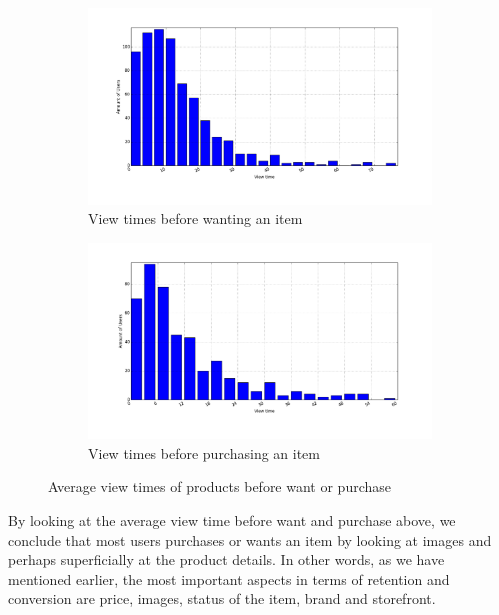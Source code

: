 \begin{figure}[H]
  \centering
  \begin{subfigure}{.5\textwidth}
      \centering
      \includegraphics[width=\dualGraphWidth]{image/product_wanteddistribution.png}
      \caption{View times before wanting an item}
      \label{figure:viewWant}
  \end{subfigure}%
  \begin{subfigure}{.5\textwidth}
      \centering
      \includegraphics[width=\dualGraphWidth]{image/product_purchase_intendeddistribution.png}
      \caption{View times before purchasing an item}
      \label{figure:viewBuy}
  \end{subfigure}
  \caption{Average view times of products before want or purchase}
  \label{fig:view-times}
\end{figure}

By looking at the average view time before want and purchase above, we conclude
that most users purchases or wants an item by looking at images and perhaps
superficially at the product details. In other words, as we have mentioned
earlier, the most important aspects in terms of retention and conversion are
price, images, status of the item, brand and storefront.

